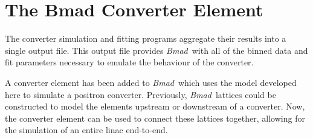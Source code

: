 \documentclass[letter,
               biblatex,     %
               keeplastbox,   %
               ]{jacow}
\newcommand{\bmad}{\textit{Bmad}}
\begin{document}

%
%


%
%


\section{The Bmad Converter Element}

The converter simulation and fitting programs aggregate their results into a single output file.
This output file provides \bmad \, with all of the binned data and fit parameters necessary to emulate the behaviour of the converter.

A converter element has been added to \bmad \, which uses the model developed here to simulate a positron converter.
Previously, \bmad \, lattices could be constructed to model the elements upstream or downstream of a converter.
Now, the converter element can be used to connect these lattices together, allowing for the simulation of an entire linac end-to-end.
\end{document}
